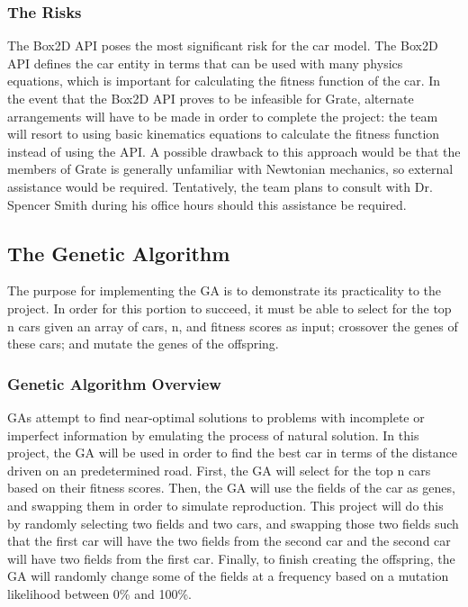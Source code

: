 \documentclass{article}
\begin{document}
\subsubsection{The Risks}
The Box2D API poses the most significant risk for the car model. The Box2D API 
defines the car entity in terms that can be used with many physics equations, 
which is important for calculating the fitness function of the car. In the event 
that the Box2D API \textcolor{RoyalPurple}{proves} to be infeasible for Grate, alternate \textcolor{RoyalPurple}{arrangements}
will have to be made in order to complete the project: the team will resort to 
using basic kinematics equations to calculate the fitness function instead of 
using the API. A possible drawback to this approach would be that the members of 
Grate is generally unfamiliar with Newtonian mechanics, so external assistance 
would be required. Tentatively, the team plans to consult with Dr. Spencer Smith 
during his office hours should this assistance be required.

\subsection{The Genetic Algorithm}
The purpose for implementing the GA is to demonstrate its practicality to 
the project. In order for this portion to succeed, it must be able to select for 
the top n cars given an array of cars, n, and fitness scores as input; crossover 
the genes of these cars; and mutate the genes of the offspring.

\subsubsection{Genetic Algorithm Overview}
GAs attempt to find near-optimal solutions to problems with incomplete or 
imperfect information by emulating the process of natural solution. In this 
project, the GA will be used in order to find the best car in terms of the 
distance driven on an predetermined road. First, the GA will select for the top 
n cars based on their fitness scores. Then, the GA will use the fields of the 
car as genes, and swapping them in order to simulate reproduction. This project 
will do this by randomly selecting two fields and two cars, and swapping those 
two fields such that the first car will have the two fields from the second car 
and the second car will have two fields from the first car. Finally, to finish 
creating the offspring, the GA will randomly change some of the fields at a 
frequency based on a mutation likelihood between 0\% and 100\%. 
\end{document}
